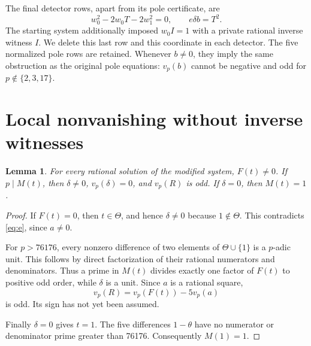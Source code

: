 \documentclass[11pt,a4paper]{article}
\newtheorem{lemma}[theorem]{Lemma}
\theoremstyle{remark}\newtheorem{remark}[theorem]{Remark}
\begin{document}
The final detector rows, apart from its pole certificate, are
\begin{equation}\label{eq:trace-clearing}
 w_0^2-2w_0T-2w_1^2=0,
 \qquad e\delta b=T^2.
\end{equation}
The starting system additionally imposed $w_0I=1$ with a private
rational inverse witness $I$. We delete this last row and this
coordinate in each detector. The five normalized pole rows are
retained. Whenever $b\ne0$, they imply the same obstruction as the
original pole equations: $v_p(b)$ cannot be negative and odd for
$p\notin\{2,3,17\}$.

\section{Local nonvanishing without inverse witnesses}

\begin{lemma}\label{lem:contacts}
For every rational solution of the modified system, $F(t)\ne0$.
If $p\mid M(t)$, then $\delta\ne0$, $v_p(\delta)=0$, and
$v_p(R)$ is odd. If $\delta=0$, then $M(t)=1$.
\end{lemma}
\begin{proof}
If $F(t)=0$, then $t\in\Theta$, and hence $\delta\ne0$ because
$1\notin\Theta$. This contradicts \eqref{eq:e}, since $a\ne0$.

For $p>76176$, every nonzero difference of two elements of
$\Theta\cup\{1\}$ is a $p$-adic unit. This follows by direct
factorization of their rational numerators and denominators. Thus a
prime in $M(t)$ divides exactly one factor of $F(t)$ to positive odd
order, while $\delta$ is a unit. Since $a$ is a rational square,
\[
                    v_p(R)=v_p(F(t))-5v_p(a)
\]
is odd. Its sign has not yet been assumed.

Finally $\delta=0$ gives $t=1$. The five differences $1-\theta$ have
no numerator or denominator prime greater than 76176. Consequently
$M(1)=1$.
\end{proof}
\end{document}
